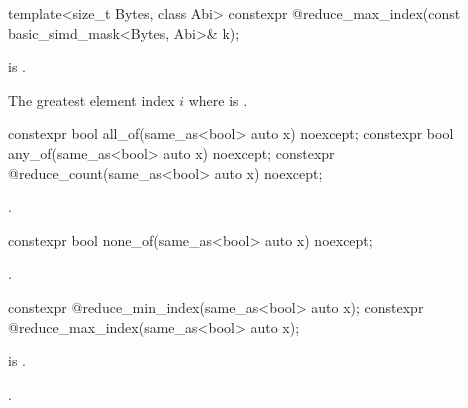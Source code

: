 \begin{itemdecl}
template<size_t Bytes, class Abi>
  constexpr @\simdsizetype@ reduce_max_index(const basic_simd_mask<Bytes, Abi>& k);
\end{itemdecl}

\begin{itemdescr}
  \pnum\expects
   is .

  \pnum\returns
  The greatest element index $i$ where  is .
\end{itemdescr}

\begin{itemdecl}
constexpr bool all_of(same_as<bool> auto x) noexcept;
constexpr bool any_of(same_as<bool> auto x) noexcept;
constexpr @\simdsizetype@ reduce_count(same_as<bool> auto x) noexcept;
\end{itemdecl}
\begin{itemdescr}
  \pnum\returns {}.
\end{itemdescr}

\begin{itemdecl}
constexpr bool none_of(same_as<bool> auto x) noexcept;
\end{itemdecl}
\begin{itemdescr}
  \pnum\returns {}.
\end{itemdescr}

\begin{itemdecl}
constexpr @\simdsizetype@ reduce_min_index(same_as<bool> auto x);
constexpr @\simdsizetype@ reduce_max_index(same_as<bool> auto x);
\end{itemdecl}

\begin{itemdescr}
  \pnum\expects {} is .

  \pnum\returns {}.
\end{itemdescr}

